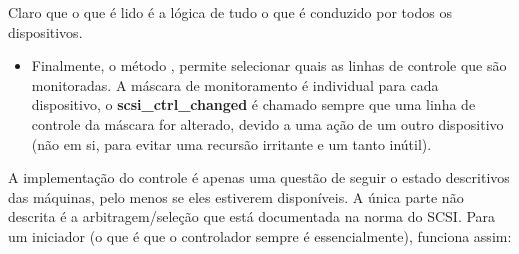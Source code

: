 \documentclass[letterpaper,10pt,brazil]{sphinxmanual}
\begin{document}
Claro que o que é lido é a lógica de tudo o que é conduzido por todos os
dispositivos.
\begin{itemize}
\item {} 
Finalmente, o método
, permite
selecionar quais as linhas de controle que são monitoradas. A máscara
de monitoramento é individual para cada dispositivo, o
\textbf{scsi\_ctrl\_changed} é chamado sempre que uma linha de controle da
máscara for alterado, devido a uma ação de um outro dispositivo (não
em si, para evitar uma recursão irritante e um tanto inútil).

\end{itemize}

A implementação do controle é apenas uma questão de seguir o estado
descritivos das máquinas, pelo menos se eles estiverem disponíveis.
A única parte não descrita é a arbitragem/seleção que está documentada
na norma do SCSI. Para um iniciador (o que é que o controlador sempre é
essencialmente), funciona assim:
\end{document}
